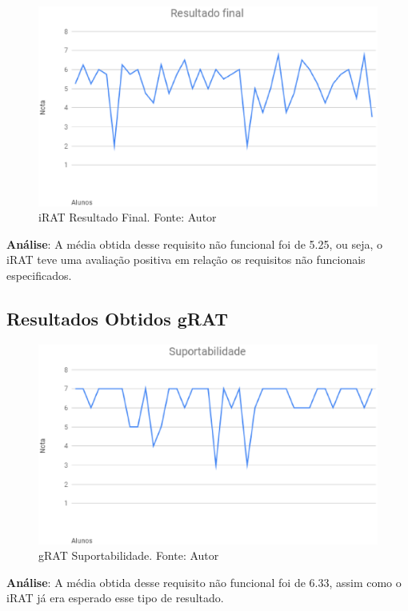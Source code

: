 \begin{figure}[H]
	\centering
  \includegraphics[keepaspectratio=true,scale=0.5]{figuras/iRAT_Resultado_Final.eps}
  \caption[iRAT Resultado Final.]{iRAT Resultado Final. Fonte: Autor}
\end{figure}

\textbf{Análise}: A média obtida desse requisito não funcional foi de 5.25, ou seja, o iRAT teve uma avaliação
positiva em relação os requisitos não funcionais especificados.

\subsection{Resultados Obtidos gRAT}

\begin{figure}[H]
	\centering
  \includegraphics[keepaspectratio=true,scale=0.5]{figuras/gRAT_Suportabilidade.eps}
  \caption[gRAT Suportabilidade.]{gRAT Suportabilidade. Fonte: Autor}
\end{figure}

\textbf{Análise}: A média obtida desse requisito não funcional foi de 6.33, assim como o iRAT já era
esperado esse tipo de resultado.

